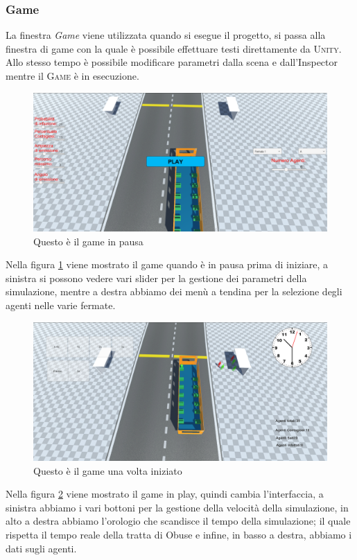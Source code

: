 \documentclass[12pt, openany]{book}
\begin{document}
	\subsubsection{Game}
		La finestra \emph{Game} viene utilizzata quando si esegue il progetto, si passa alla finestra di game con la quale è possibile effettuare testi direttamente da \textsc{Unity}. Allo stesso tempo è possibile modificare parametri dalla scena e dall'Inspector mentre il \textsc{Game} è in esecuzione.
		\begin{figure}[H]
			\centering
			\includegraphics[width=1\linewidth]{"Immagini/PausedGame.png"}
			\caption{Questo è il game in pausa}
			\label{fig:PausedGame}
		\end{figure}
	Nella figura \ref{fig:PausedGame} viene mostrato il game quando è in pausa prima di iniziare, a sinistra si possono vedere vari slider per la gestione dei parametri della simulazione, mentre a destra abbiamo dei menù a tendina per la selezione degli agenti nelle varie fermate.
	\begin{figure}[H]
		\centering
		\includegraphics[width=1\linewidth]{"Immagini/PlayingGame.png"}
		\caption{Questo è il game una volta iniziato}
		\label{fig:PlayingGame}
	\end{figure}
	Nella figura \ref{fig:PlayingGame} viene mostrato il game in play, quindi cambia l'interfaccia, a sinistra abbiamo i vari bottoni per la gestione della velocità della simulazione, in alto a destra abbiamo l'orologio che scandisce il tempo della simulazione; il quale rispetta il tempo reale della tratta di Obuse e infine, in basso a destra, abbiamo i dati sugli agenti.
\end{document}
